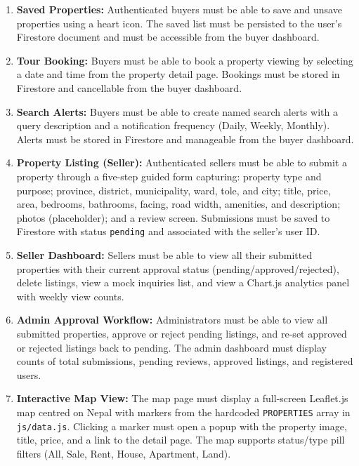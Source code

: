 \documentclass[12pt,a4paper]{report}
\begin{document}
\begin{enumerate}[leftmargin=2.5em]
  \item \textbf{Saved Properties:}
    Authenticated buyers must be able to save and unsave properties using a heart
    icon. The saved list must be persisted to the user's Firestore document and
    must be accessible from the buyer dashboard.

  \item \textbf{Tour Booking:}
    Buyers must be able to book a property viewing by selecting a date and time
    from the property detail page. Bookings must be stored in Firestore and
    cancellable from the buyer dashboard.

  \item \textbf{Search Alerts:}
    Buyers must be able to create named search alerts with a query description
    and a notification frequency (Daily, Weekly, Monthly). Alerts must be
    stored in Firestore and manageable from the buyer dashboard.

  \item \textbf{Property Listing (Seller):}
    Authenticated sellers must be able to submit a property through a five-step
    guided form capturing: property type and purpose; province, district,
    municipality, ward, tole, and city; title, price, area, bedrooms, bathrooms,
    facing, road width, amenities, and description; photos (placeholder); and a
    review screen. Submissions must be saved to Firestore with status
    \texttt{pending} and associated with the seller's user ID.

  \item \textbf{Seller Dashboard:}
    Sellers must be able to view all their submitted properties with their current
    approval status (pending/approved/rejected), delete listings, view a mock
    inquiries list, and view a Chart.js analytics panel with weekly view counts.

  \item \textbf{Admin Approval Workflow:}
    Administrators must be able to view all submitted properties, approve or
    reject pending listings, and re-set approved or rejected listings back to
    pending. The admin dashboard must display counts of total submissions,
    pending reviews, approved listings, and registered users.

  \item \textbf{Interactive Map View:}
    The map page must display a full-screen Leaflet.js map centred on Nepal
    with markers from the hardcoded \texttt{PROPERTIES} array in
    \texttt{js/data.js}. Clicking a marker
    must open a popup with the property image, title, price, and a link to the
    detail page. The map supports status/type pill filters (All, Sale, Rent,
    House, Apartment, Land).


\end{enumerate}
\end{document}
